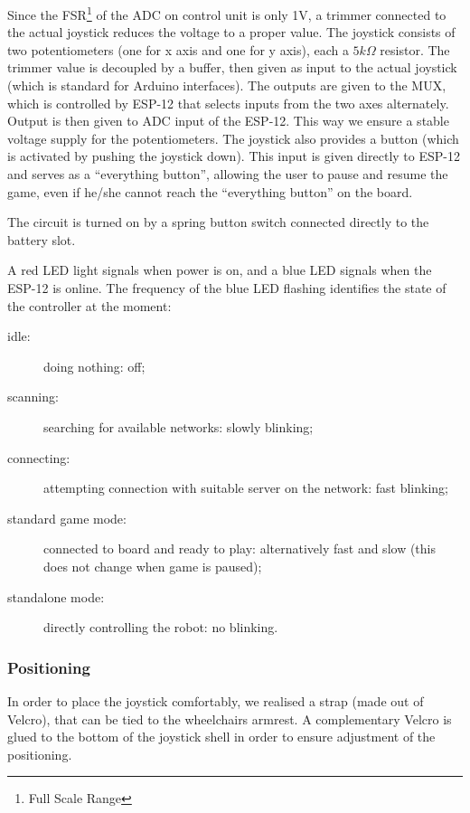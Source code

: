 \documentclass[a4paper,twoside]{book}
\begin{document}
Since the FSR\footnote{Full Scale Range} of the ADC on control unit is only 1V, a trimmer connected to the actual joystick reduces the voltage to a proper value. The joystick consists of two potentiometers (one for x axis and one for y axis), each a $5k\Omega$ resistor.
The trimmer value is decoupled by a buffer, then given as input to the actual joystick (which is standard for Arduino interfaces). The outputs are given to the MUX, which is controlled by ESP-12 that selects inputs from the two axes alternately. Output is then given to ADC input of the ESP-12.
This way we ensure a stable voltage supply for the potentiometers. 
The joystick also provides a button (which is activated by pushing the joystick down). This input is given directly to ESP-12 and serves as a \textquotedblleft{}everything button\textquotedblright{}, allowing the user to pause and resume the game, even if he/she cannot reach the \textquotedblleft{}everything button\textquotedblright{} on the board.

The circuit is turned on by a spring button switch connected directly to the battery slot.

\beforelist* A red LED light signals when power is on, and a blue LED signals when the ESP-12 is online. The frequency of the blue LED flashing identifies the state of the controller at the moment:
\begin{description}
\item[idle:] doing nothing: off;
\item[scanning:] searching for available networks: slowly blinking;
\item[connecting:] attempting connection with suitable server on the network: fast blinking;
\item[standard game mode:] connected to board and ready to play: alternatively fast and slow (this does not change when game is paused);
\item[standalone mode:] directly controlling the robot: no blinking.
\end{description}
\afterlist*

\subsubsection{Positioning}

In order to place the joystick comfortably, we realised a strap (made out of Velcro), that can be tied to the wheelchairs armrest. A complementary Velcro is glued to the bottom of the joystick shell in order to ensure adjustment of the positioning. 
\end{document}

